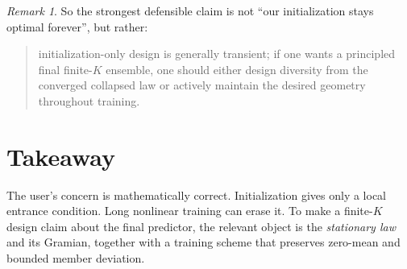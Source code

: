 \documentclass[11pt]{article}
\theoremstyle{remark}
\newtheorem{remark}[theorem]{Remark}
\begin{document}
\begin{remark}
So the strongest defensible claim is not ``our initialization stays optimal forever'', but rather:

\begin{quote}
initialization-only design is generally transient; if one wants a principled final finite-$K$ ensemble, one should either design diversity from the converged collapsed law or actively maintain the desired geometry throughout training.
\end{quote}
\end{remark}

\section{Takeaway}

The user's concern is mathematically correct. Initialization gives only a local entrance condition. Long nonlinear training can erase it. To make a finite-$K$ design claim about the final predictor, the relevant object is the \emph{stationary law} and its Gramian, together with a training scheme that preserves zero-mean and bounded member deviation.
\end{document}
